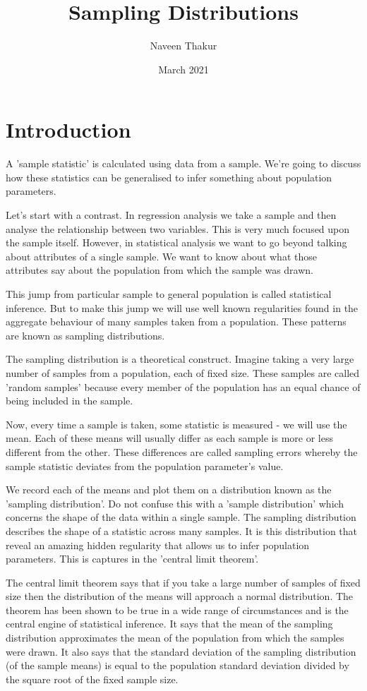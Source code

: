 \documentclass{article}
\title{Sampling Distributions}
\author{Naveen Thakur }
\date{March 2021}
\begin{document}
\maketitle

\section{Introduction}
A 'sample statistic' is calculated using data from a sample. We're going to discuss how these statistics can be generalised to infer something about population parameters.

Let's start with a contrast. In regression analysis we take a sample and then analyse the relationship between two variables. This is very much focused upon the sample itself. However, in statistical analysis we want to go beyond talking about attributes of a single sample. We want to know about what those attributes say about the population from which the sample was drawn.

This jump from particular sample to general population is called statistical inference. But to make this jump we will use well known regularities found in the aggregate behaviour of many samples taken from a population. These patterns are known as sampling distributions.

The sampling distribution is a theoretical construct. Imagine taking a very large number of samples from a population, each of fixed size. These samples are called 'random samples' because every member of the population has an equal chance of being included in the sample. 

Now, every time a sample is taken, some statistic is measured - we will use the mean. Each of these means will usually differ as each sample is more or less different from the other. These differences are called sampling errors whereby the sample statistic deviates from the population parameter's value.

We record each of the means and plot them on a distribution known as the 'sampling distribution'. Do not confuse this with a 'sample distribution' which concerns the shape of the data within a single sample. The sampling distribution describes the shape of a statistic across many samples. It is this distribution that reveal an amazing hidden regularity that allows us to infer population parameters. This is captures in the 'central limit theorem'.

The central limit theorem says that if you take a large number of samples of fixed size then the distribution of the means will approach a normal distribution. The theorem has been shown to be true in a wide range of circumstances and is the central engine of statistical inference. It says that the mean of the sampling distribution approximates the mean of the population from which the samples were drawn. It also says that the standard deviation of the sampling distribution (of the sample means) is equal to the population standard deviation divided by the square root of the fixed sample size.
\end{document}
